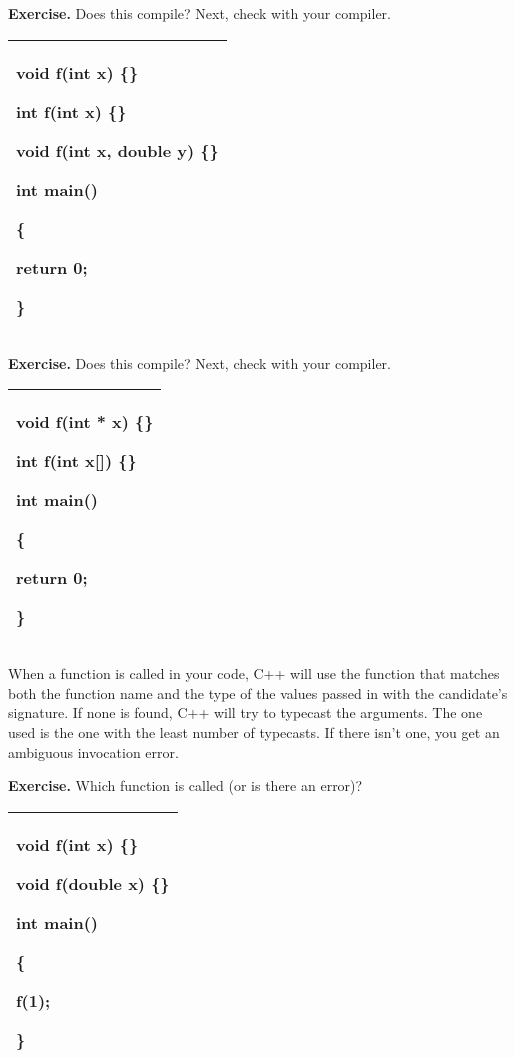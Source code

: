 \documentclass[
]{article}
\begin{document}
\textbf{Exercise.} Does this compile? Next, check with your compiler.

\begin{longtable}[]{@{}l@{}}
\toprule
\endhead
\begin{minipage}[t]{0.97\columnwidth}\raggedright
void f(int x) \{\}

int f(int x) \{\}

void f(int x, double y) \{\}

int main()

\{

return 0;

\}\strut
\end{minipage}\tabularnewline
\bottomrule
\end{longtable}

\textbf{Exercise.} Does this compile? Next, check with your compiler.

\begin{longtable}[]{@{}l@{}}
\toprule
\endhead
\begin{minipage}[t]{0.97\columnwidth}\raggedright
void f(int * x) \{\}

int f(int x{[}{]}) \{\}

int main()

\{

return 0;

\}\strut
\end{minipage}\tabularnewline
\bottomrule
\end{longtable}

When a function is called in your code, C++ will use the function that
matches both the function name and the type of the values passed in with
the candidate's signature. If none is found, C++ will try to typecast
the arguments. The one used is the one with the least number of
typecasts. If there isn't one, you get an ambiguous invocation error.

\textbf{Exercise.} Which function is called (or is there an error)?

\begin{longtable}[]{@{}l@{}}
\toprule
\endhead
\begin{minipage}[t]{0.97\columnwidth}\raggedright
void f(int x) \{\}

void f(double x) \{\}

int main()

\{

f(1);

\}\strut
\end{minipage}\tabularnewline
\bottomrule
\end{longtable}
\end{document}
